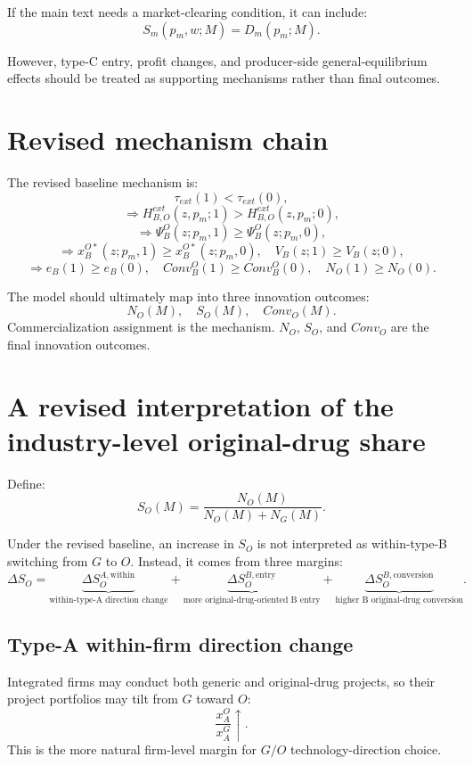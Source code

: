 \documentclass[12pt]{article}
\begin{document}
If the main text needs a market-clearing condition, it can include:
\[
S_m(p_m,w;M)=D_m(p_m;M).
\]

However, type-C entry, profit changes, and producer-side general-equilibrium effects should be treated as supporting mechanisms rather than final outcomes.

\section{Revised mechanism chain}

The revised baseline mechanism is:
\[
\tau_{ext}(1)<\tau_{ext}(0),
\]
\[
\Rightarrow
H_{B,O}^{ext}(z,p_m;1)
>
H_{B,O}^{ext}(z,p_m;0),
\]
\[
\Rightarrow
\Psi_B^O(z;p_m,1)
\ge
\Psi_B^O(z;p_m,0),
\]
\[
\Rightarrow
x_B^{O*}(z;p_m,1)
\ge
x_B^{O*}(z;p_m,0),
\quad
V_B(z;1)\ge V_B(z;0),
\]
\[
\Rightarrow
e_B(1)\ge e_B(0),
\quad
Conv_B^O(1)\ge Conv_B^O(0),
\quad
N_O(1)\ge N_O(0).
\]

The model should ultimately map into three innovation outcomes:
\[
N_O(M),\quad S_O(M),\quad Conv_O(M).
\]
Commercialization assignment is the mechanism. $N_O$, $S_O$, and $Conv_O$ are the final innovation outcomes.

\section{A revised interpretation of the industry-level original-drug share}

Define:
\[
S_O(M)
=
\frac{N_O(M)}{N_O(M)+N_G(M)}.
\]

Under the revised baseline, an increase in $S_O$ is not interpreted as within-type-B switching from $G$ to $O$. Instead, it comes from three margins:
\[
\Delta S_O
=
\underbrace{\Delta S_O^{A,\mathrm{within}}}_{\text{within-type-A direction change}}
+
\underbrace{\Delta S_O^{B,\mathrm{entry}}}_{\text{more original-drug-oriented B entry}}
+
\underbrace{\Delta S_O^{B,\mathrm{conversion}}}_{\text{higher B original-drug conversion}}.
\]

\subsection{Type-A within-firm direction change}

Integrated firms may conduct both generic and original-drug projects, so their project portfolios may tilt from $G$ toward $O$:
\[
\frac{x_A^O}{x_A^G}\uparrow.
\]
This is the more natural firm-level margin for $G/O$ technology-direction choice.
\end{document}
